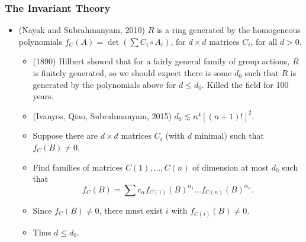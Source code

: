 \documentclass[usenames,dvipsnames,12pt]{beamer}
\begin{document}
\begin{frame}

\frametitle{The Invariant Theory}

\begin{itemize}
    \item (Nayak and Subrahmanyam, 2010) $R$ is a ring generated by the homogeneous polynomials $f_C(A) = \det(\sum C_i \circ A_i)$, for $d \times d$ matrices $C_i$, for all $d > 0$.
    \begin{itemize}
        \pause
        \item (1890) Hilbert showed that for a fairly general family of group actions, $R$ is finitely generated, so we should expect there is some $d_0$ such that $R$ is generated by the polynomials above for $d \leq d_0$. Killed the field for 100 years.

        \pause
        \item (Ivanyos, Qiao, Subrahmanyam, 2015) $d_0 \lesssim n^4 [(n+1)!]^2$.

        \pause
        \item Suppose there are $d \times d$ matrices $C_i$ (with $d$ minimal) such that $f_C(B) \neq 0$.

        \pause
        \item Find families of matrices $C(1), \dots, C(n)$ of dimension at most $d_0$ such that
        \[ f_C(B) = \sum c_\alpha f_{C(1)}(B)^{\alpha_1} \dots f_{C(n)}(B)^{\alpha_n}.  \]

        \pause
        \item Since $f_C(B) \neq 0$, there must exist $i$ with $f_{C(i)}(B) \neq 0$.

        \pause
        \item Thus $d \leq d_0$.
    \end{itemize}
\end{itemize}

\end{frame}
\end{document}
